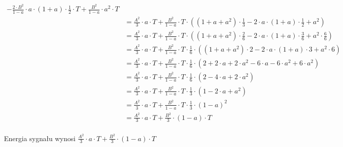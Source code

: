 \begin{task}
\begin{align*}
 - \frac{2\cdot B^2}{1 - a}\cdot a \cdot \left( 1 + a \right) \cdot \frac{1}{2} \cdot T
 + \frac{B^2}{1 - a} \cdot a^2 \cdot T\\
 &=\frac{A^2}{3}\cdot a \cdot T
 +\frac{B^2}{1 - a}\cdot T \cdot \left( \left(1 +a + a^2 \right)\cdot \frac{1}{3}
 - 2 \cdot a \cdot \left( 1 + a \right) \cdot \frac{1}{2}
 + a^2 \right)\\
 &=\frac{A^2}{3}\cdot a \cdot T
 +\frac{B^2}{1 - a}\cdot T \cdot \left( \left(1 +a + a^2 \right)\cdot \frac{2}{6}
 - 2 \cdot a \cdot \left( 1 + a \right) \cdot \frac{3}{6}
 + a^2 \cdot \frac{6}{6} \right)\\ 
 &=\frac{A^2}{3}\cdot a \cdot T
 +\frac{B^2}{1 - a}\cdot T \cdot \frac{1}{6} \cdot \left( \left(1 +a + a^2 \right)\cdot 2
 - 2\cdot a \cdot \left( 1 + a \right) \cdot 3
 + a^2 \cdot 6 \right)\\  
 &=\frac{A^2}{3}\cdot a \cdot T
 +\frac{B^2}{1 - a}\cdot T \cdot \frac{1}{6} \cdot \left( 2 +2\cdot a + 2\cdot a^2 - 6\cdot a - 6\cdot a^2 + 6 \cdot a^2 \right)\\
 &=\frac{A^2}{3}\cdot a \cdot T
 +\frac{B^2}{1 - a}\cdot T \cdot \frac{1}{6} \cdot \left( 2 - 4 \cdot a + 2\cdot a^2 \right)\\
 &=\frac{A^2}{3}\cdot a \cdot T
 +\frac{B^2}{1 - a}\cdot T \cdot \frac{1}{3} \cdot \left( 1 - 2 \cdot a + a^2 \right)\\
 &=\frac{A^2}{3}\cdot a \cdot T
 +\frac{B^2}{1 - a}\cdot T \cdot \frac{1}{3} \cdot \left( 1 - a \right)^2\\
 &=\frac{A^2}{3}\cdot a \cdot T
 + \frac{B^2}{3} \cdot \left( 1 - a \right)\cdot T\\
\end{align*}

Energia sygnału wynosi $\frac{A^2}{3}\cdot a \cdot T + \frac{B^2}{3} \cdot \left( 1 - a \right)\cdot T$
\end{task}